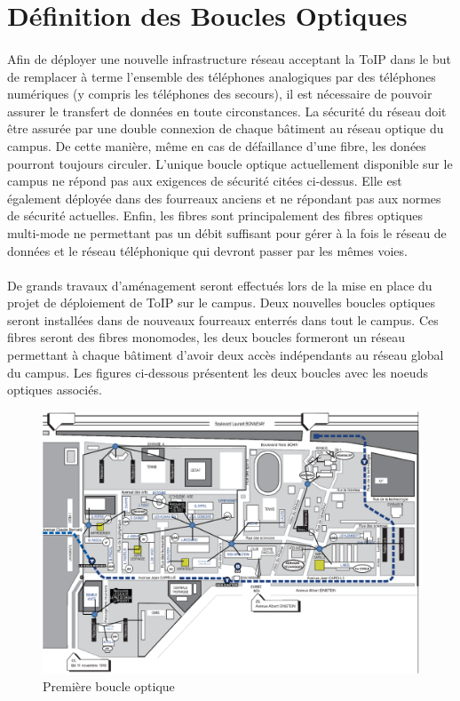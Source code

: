 \section{Définition des Boucles Optiques}
\paragraph{} Afin de déployer une nouvelle infrastructure réseau acceptant la ToIP dans le but de remplacer à terme l'ensemble des téléphones analogiques par des téléphones numériques (y compris les téléphones des secours), il est nécessaire de pouvoir assurer le transfert de données en toute circonstances. La sécurité du réseau doit être assurée par une double connexion de chaque bâtiment au réseau optique du campus. De cette manière, même en cas de défaillance d'une fibre, les donées pourront toujours circuler. L'unique boucle optique actuellement disponible sur le campus ne répond pas aux exigences de sécurité citées ci-dessus. Elle est également déployée dans des fourreaux anciens et ne répondant pas aux normes de sécurité actuelles. Enfin, les fibres sont principalement des fibres optiques multi-mode ne permettant pas un débit suffisant pour gérer à la fois le réseau de données et le réseau téléphonique qui devront passer par les mêmes voies.
\paragraph{} De grands travaux d'aménagement seront effectués lors de la mise en place du projet de déploiement de ToIP sur le campus. Deux nouvelles boucles optiques seront installées dans de nouveaux fourreaux enterrés dans tout le campus. Ces fibres seront des fibres monomodes, les deux boucles formeront un réseau permettant à chaque bâtiment d'avoir deux accès indépendants au réseau global du campus. Les figures ci-dessous présentent les deux boucles avec les noeuds optiques associés.

\begin{figure}[h]
  \caption{\label{Plan_boucle1} Première boucle optique}
  \includegraphics[scale=0.7]{Boucle1.png}
\end{figure}

